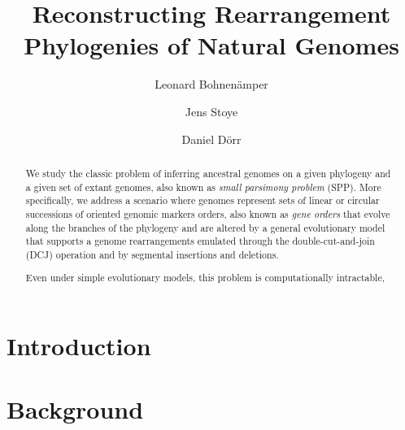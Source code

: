 \documentclass[runningheads]{llncs}
\begin{document}
%
\title{Reconstructing Rearrangement Phylogenies of Natural Genomes}
%
%
\author{Leonard Bohnen\"amper \and
    Jens Stoye  \and
    Daniel D\"orr 
}
%
%

%
\maketitle              %
%
\begin{abstract}
    We study the classic problem of inferring ancestral genomes on a given phylogeny and a given set of extant genomes, also known as \emph{small parsimony problem} (SPP). 
    More specifically, we address a scenario where genomes represent sets of linear or circular successions of oriented genomic markers orders, also known as \emph{gene orders} that evolve along the branches of the phylogeny and are altered by a general evolutionary model that supports a genome rearrangements emulated through the double-cut-and-join (DCJ) operation and by segmental insertions and deletions.

    Even under simple evolutionary models, this problem is computationally intractable, 

\end{abstract}
%
%
%

\section{Introduction}
\section{Background}
\end{document}
